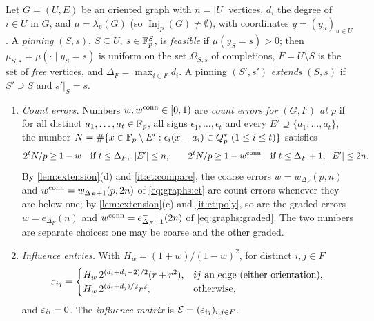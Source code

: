 \begin{definition}\label{def:mid:influence}
Let $G=(U,E)$ be an oriented graph with $n=|U|$ vertices, $d_i$ the degree of
$i\in U$ in $G$, and $\mu=\lambda_p(G)$ (so $\operatorname{Inj}_p(G)\ne\emptyset$),
with coordinates $y=(y_u)_{u\in U}$. A \emph{pinning} $(S,s)$, $S\subseteq U$,
$s\in\mathbb F_p^S$, is \emph{feasible} if $\mu(y_S=s)>0$; then
$\mu_{S,s}=\mu(\cdot\mid y_S=s)$ is uniform on the set $\Omega_{S,s}$ of
completions, $F=U\setminus S$ is the set of \emph{free} vertices, and
$\Delta_F=\max_{i\in F}d_i$. A pinning $(S',s')$ \emph{extends} $(S,s)$ if
$S'\supseteq S$ and $s'|_S=s$.
\begin{enumerate}[label=\textup{(\roman*)}]
\item \emph{Count errors.} Numbers $w,w^{\rm conn}\in[0,1)$ are \emph{count
  errors for $(G,F)$ at $p$} if for all distinct $a_1,\dots,a_t\in\mathbb F_p$, all
  signs $\epsilon_1,\dots,\epsilon_t$ and every $E'\supseteq\{a_1,\dots,a_t\}$,
  the number
  $N=\#\{x\in\mathbb F_p\setminus E':\epsilon_i(x-a_i)\in Q_{p}^{*}\ (1\le i\le t)\}$
  satisfies
  \begin{equation}\label{eq:mid:standing}
    \frac{2^tN}p\ge1-w\quad\text{if }t\le\Delta_F,\ |E'|\le n,\qquad
    \frac{2^tN}p\ge1-w^{\rm conn}\quad\text{if }t\le\Delta_F+1,\ |E'|\le2n .
  \end{equation}
  By \cref{lem:extension}(d) and \ref{it:et:compare}, the coarse errors
  $w=w_{\Delta_F}(p,n)$ and $w^{\rm conn}=w_{\Delta_F+1}(p,2n)$ of
  \eqref{eq:graphs:et} are count errors whenever they are below one; by
  \cref{lem:extension}(c) and \ref{it:et:poly}, so are the graded errors
  $w=e^-_{\Delta_F}(n)$ and $w^{\rm conn}=e^-_{\Delta_F+1}(2n)$ of
  \eqref{eq:graphs:graded}. The two numbers are separate choices: one may be
  coarse and the other graded.
\item \emph{Influence entries.} With $H_w=(1+w)/(1-w)^2$, for distinct
  $i,j\in F$
  \begin{equation}\label{eq:mid:epsij}
    \varepsilon_{ij}=\begin{cases}H_w\,2^{(d_i+d_j-2)/2}(r+r^2),&ij\text{ an edge
    (either orientation)},\\ H_w\,2^{(d_i+d_j)/2}r^2,&\text{otherwise},\end{cases}
  \end{equation}
  and $\varepsilon_{ii}=0$. The \emph{influence matrix} is
  $\mathcal E=(\varepsilon_{ij})_{i,j\in F}$.
\end{enumerate}
\end{definition}

